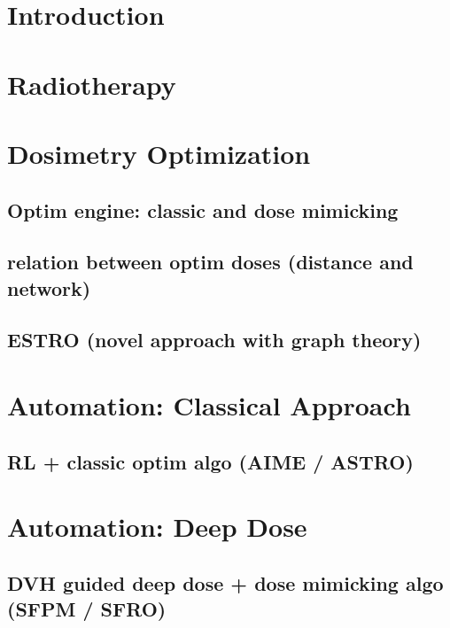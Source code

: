 \documentclass[a4paper]{book}
\begin{document}
	
	
	
	
	
	
	
	\listoffigures
	\listoftables
	\tableofcontents
	\chapterStyleToC
	
	\chapter{Introduction}
	\begin{chapterabstract}
		
	\end{chapterabstract}
	\clearpage
	\localtableofcontents
	
	
	\chapter{Radiotherapy}
	\begin{chapterabstract}
		
	\end{chapterabstract}
	\clearpage
	\localtableofcontents
	
	
	\chapter{Dosimetry Optimization}
	\begin{chapterabstract}
	\end{chapterabstract}
	\clearpage
	\localtableofcontents
	\section{Optim engine: classic and dose mimicking}
	\section{relation between optim doses (distance and network)}
	\section{ESTRO (novel approach with graph theory)}
	
	\chapter{Automation: Classical Approach}
	\begin{chapterabstract}
	\end{chapterabstract}
	\clearpage
	\localtableofcontents
	\section{RL + classic optim algo (AIME / ASTRO)}
	
	\chapter{Automation: Deep Dose}
	\begin{chapterabstract}
	\end{chapterabstract}
	\clearpage
	\localtableofcontents
	\section{DVH guided deep dose + dose mimicking algo (SFPM / SFRO)}
	
\end{document}
